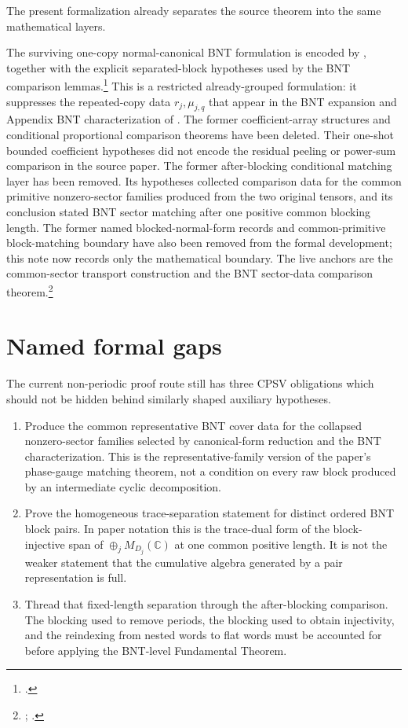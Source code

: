 \documentclass{article}
\begin{document}
The present formalization already separates the source theorem into the same
mathematical layers.

The surviving one-copy normal-canonical BNT formulation is encoded by
, together with the explicit separated-block
hypotheses used by the BNT comparison lemmas.\footnote{%
.}
This is a restricted already-grouped formulation: it suppresses the
repeated-copy data $r_j,\mu_{j,q}$ that appear in the BNT expansion and
Appendix BNT characterization of \cite{Cirac2016MPDO_arXiv}.
The former coefficient-array structures and conditional proportional comparison
theorems have been deleted. Their one-shot bounded coefficient hypotheses did
not encode the residual peeling or power-sum comparison in the source paper.
The former after-blocking conditional matching layer has been removed. Its
hypotheses collected comparison data for the common primitive nonzero-sector
families produced from the two original tensors, and its conclusion stated BNT
sector matching after one positive common blocking length. The former named
blocked-normal-form records and common-primitive block-matching boundary have
also been removed from the formal development; this note now records only the
mathematical boundary. The live anchors are the common-sector transport
construction and the BNT sector-data comparison theorem.\footnote{%
;
.}

\section{Named formal gaps}

The current non-periodic proof route still has three CPSV obligations
which should not be hidden behind similarly shaped auxiliary hypotheses.

\begin{enumerate}
  \item Produce the common representative BNT cover data for the collapsed
  nonzero-sector families selected by canonical-form reduction and the BNT
  characterization. This is the representative-family version of the paper's
  phase-gauge matching theorem, not a condition on every raw block produced by
  an intermediate cyclic decomposition.

  \item Prove the homogeneous trace-separation statement for distinct ordered
  BNT block pairs. In paper notation this is the trace-dual form of the
  block-injective span of $\oplus_jM_{D_j}(\mathbb C)$ at one common positive
  length.
  It is not the weaker statement that the cumulative algebra generated by a
  pair representation is full.

  \item Thread that fixed-length separation through the after-blocking
  comparison. The blocking used to remove periods, the blocking used to obtain
  injectivity, and the reindexing from nested words to flat words must be
  accounted for before applying the BNT-level Fundamental Theorem.
\end{enumerate}
\end{document}
